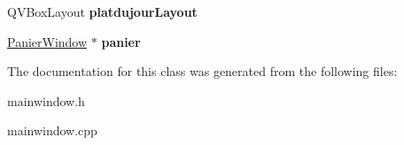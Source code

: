 \begin{DoxyCompactItemize}
\item 
Q\+V\+Box\+Layout {\bfseries platdujour\+Layout}\hypertarget{class_main_window_ae5596e4dd0873af28232699e41ff5826}{}\label{class_main_window_ae5596e4dd0873af28232699e41ff5826}

\item 
\hyperlink{class_panier_window}{Panier\+Window} $\ast$ {\bfseries panier}\hypertarget{class_main_window_a3e46dcd001729f8e6a5ef80f01153067}{}\label{class_main_window_a3e46dcd001729f8e6a5ef80f01153067}

\end{DoxyCompactItemize}


The documentation for this class was generated from the following files\+:\begin{DoxyCompactItemize}
\item 
mainwindow.\+h\item 
mainwindow.\+cpp\end{DoxyCompactItemize}
